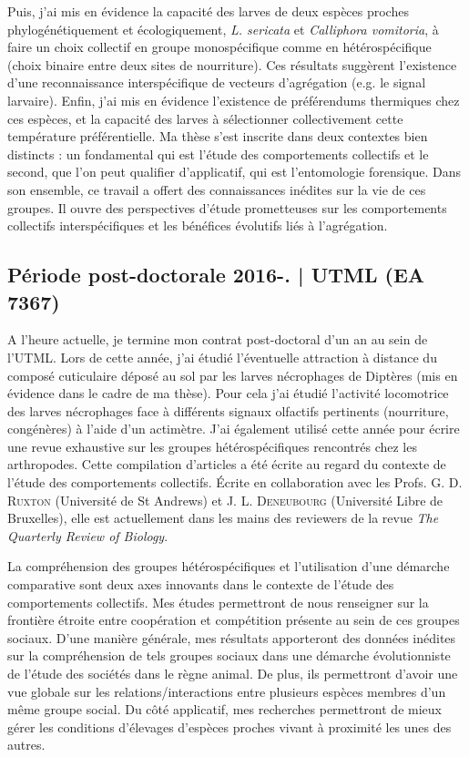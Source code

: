 \documentclass[a4paper,11pt,fleqn]{book} %
\begin{document}
Puis, j'ai mis en évidence la capacité des larves de deux espèces proches phylogénétiquement et écologiquement, \textit{L. sericata} et \textit{Calliphora vomitoria}, à faire un choix collectif en groupe monospécifique comme en hétérospécifique (choix binaire entre deux sites de nourriture). Ces résultats suggèrent l'existence d'une reconnaissance interspécifique de vecteurs d'agrégation (e.g. le signal larvaire). Enfin, j'ai mis en évidence l'existence de préférendums thermiques chez ces espèces, et la capacité des larves à sélectionner collectivement cette température préférentielle. Ma thèse s'est inscrite dans deux contextes bien distincts : un fondamental qui est l'étude des comportements collectifs et le second, que l'on peut qualifier d'applicatif, qui est l'entomologie forensique. Dans son ensemble, ce travail a offert des connaissances inédites sur la vie de ces groupes. Il ouvre des perspectives d'étude prometteuses sur les comportements collectifs interspécifiques et les bénéfices évolutifs liés à l'agrégation. 


\subsection{Période post-doctorale 2016-. | UTML (EA 7367)}
A l'heure actuelle, je termine mon contrat post-doctoral d'un an au sein de l'UTML. Lors de cette année, j'ai étudié l'éventuelle attraction à distance du composé cuticulaire déposé au sol par les larves nécrophages de Diptères (mis en évidence dans le cadre de ma thèse). Pour cela j'ai étudié l'activité locomotrice des larves nécrophages face à différents signaux olfactifs pertinents (nourriture, congénères) à l'aide d'un actimètre. 
J'ai également utilisé cette année pour écrire une revue exhaustive sur les groupes hétérospécifiques rencontrés chez les arthropodes. Cette compilation d'articles a été écrite au regard du contexte de l'étude des comportements collectifs. Écrite en collaboration avec les Profs. G. D. \textsc{Ruxton} (Université de St Andrews) et J. L. \textsc{Deneubourg} (Université Libre de Bruxelles), elle est actuellement dans les mains des reviewers de la revue \textit{The Quarterly Review of Biology}.

La compréhension des groupes hétérospécifiques et l’utilisation d’une démarche comparative sont deux axes innovants dans le contexte de l’étude des comportements collectifs. Mes études permettront de nous renseigner sur la frontière étroite entre coopération et compétition présente au sein de ces groupes sociaux. D’une manière générale, mes résultats apporteront des données inédites sur la compréhension de tels groupes sociaux dans une démarche évolutionniste de l’étude des sociétés dans le règne animal. De plus, ils permettront d’avoir une vue globale sur les relations/interactions entre plusieurs espèces membres d’un même groupe social. Du côté applicatif, mes recherches permettront de mieux gérer les conditions d’élevages d’espèces proches vivant à proximité les unes des autres.
\end{document}
